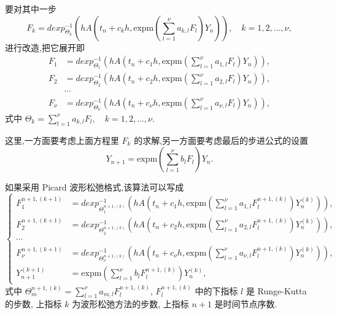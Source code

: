 要对其中一步
\begin{equation*}
	F_k=dexp_{\Theta_k}^{-1}(hA(t_n+c_kh,\mbox{expm}(\sum_{l=1}^{\nu}a_{k,l}F_l)Y_n)),\quad k=1,2,\ldots,\nu,
\end{equation*}
进行改造,把它展开即
\begin{equation*}
	\begin{aligned}
		F_1&=dexp_{\Theta_1}^{-1}(hA(t_n+c_1h,\mbox{expm}(\sum_{l=1}^{\nu}a_{1,l}F_l)Y_n)),\\
		F_2&=dexp_{\Theta_2}^{-1}(hA(t_n+c_2h,\mbox{expm}(\sum_{l=1}^{\nu}a_{2,l}F_l)Y_n)),\\
		&\cdots \\
		F_{\nu}&=dexp_{\Theta_{\nu}}^{-1}(hA(t_n+c_{\nu}h,\mbox{expm}(\sum_{l=1}^{\nu}a_{\nu,l}F_l)Y_n)),
	\end{aligned}
\end{equation*}
式中 $\Theta_k=\sum_{l=1}^{\nu}a_{k,l}F_l,\quad k=1,2,\ldots,\nu$.

这里,一方面要考虑上面方程里 $F_k$ 的求解,另一方面要考虑最后的步进公式的设置
\begin{equation*}
	Y_{n+1}=\mbox{expm}(\sum_{l=1}^{\nu}b_lF_l)Y_n.
\end{equation*}

如果采用 Picard 波形松弛格式,该算法可以写成
\begin{equation*}
	\left\lbrace\begin{aligned}
		F_1^{n+1,(k+1)}&=dexp_{\Theta_1^{n+1,(k)}}^{-1}(hA(t_n+c_1h,\mbox{expm}(\sum_{l=1}^{\nu}a_{1,l}F_l^{n+1,(k)})Y_n^{(k)})),\\
		F_2^{n+1,(k+1)}&=dexp_{\Theta_2^{n+1,(k)}}^{-1}(hA(t_n+c_2h,\mbox{expm}(\sum_{l=1}^{\nu}a_{2,l}F_l^{n+1,(k)})Y_n^{(k)})),\\
		\cdots \\
		F_{\nu}^{n+1,(k+1)}&=dexp_{\Theta_{\nu}^{n+1,(k)}}^{-1}(hA(t_n+c_{\nu}h,\mbox{expm}(\sum_{l=1}^{\nu}a_{\nu,l}F_l^{n+1,(k)})Y_n^{(k)})),\\
		Y_{n+1}^{(k+1)}&=\mbox{expm}(\sum_{l=1}^{\nu}b_lF_l^{n+1,(k)})Y_n^{(k)},
	\end{aligned}\right.
\end{equation*}
式中 $\Theta_m^{n+1,(k)} = \sum_{l=1}^{\nu}a_{m,l}F_l^{n+1,(k)}$, $F_l^{n+1,(k)}$ 中的下指标 $l$ 是 Runge-Kutta 的步数, 上指标 $k$ 为波形松弛方法的步数, 上指标 $n+1$ 是时间节点序数.

